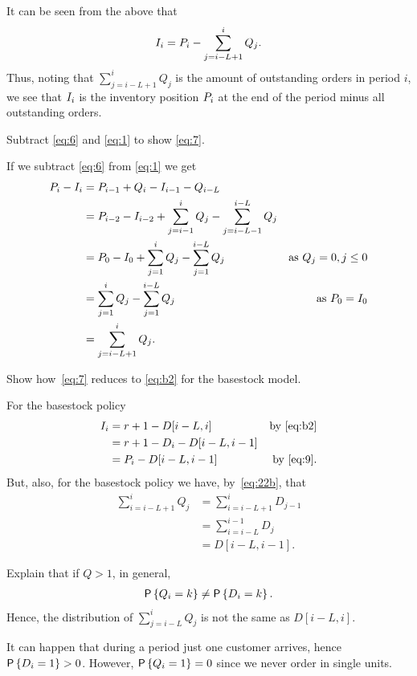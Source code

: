 It can be seen from the above that
  \begin{equation}\label{eq:7}
    I_i = P_i - \sum_{j=i-L+1}^i Q_j.
  \end{equation}
Thus, noting that $\sum_{j=i-L+1}^i Q_j$ is the amount of outstanding orders in period $i$, we see that $I_i$ is the inventory position $P_i$ at the end of the period minus all outstanding orders.

\begin{exercise}
  Subtract \eqref{eq:6} and \eqref{eq:1} to show \eqref{eq:7}.
\begin{solution}
  If we   subtract \eqref{eq:6} from \eqref{eq:1} we get 
  \begin{align*}
    P_i - I_i 
&= P_{i-1} + Q_{i} - I_{i-1} - Q_{i-L} \\
&= P_{i-2} - I_{i-2} + \sum_{j=i-1}^i Q_{j} - \sum_{j=i-L-1}^{i-L} Q_{j} \\
&= P_{0} - I_{0} + \sum_{j=1}^i Q_{j} - \sum_{j=1}^{i-L} Q_{j} &\text{as }Q_j=0, j\leq 0\\
&= \sum_{j=1}^i Q_{j} - \sum_{j=1}^{i-L} Q_{j} &\text{as }P_0 = I_0\\
&= \sum_{j=i-L+1}^i Q_{j}.
  \end{align*}
\end{solution}
\end{exercise}


\begin{exercise}
  Show how~\eqref{eq:7} reduces to \eqref{eq:b2} for the basestock model.
  \begin{solution}
For the basestock policy
    \begin{align*}
      I_i &= r+1 - D[i-L, i] & \text{by \eqref{eq:b2}} \\
&= r+1 -D_i - D[i-L, i-1] \\
&= P_i - D[i-L, i-1] & \text{ by \eqref{eq:9}}.
    \end{align*}
But, also,     for the basestock policy we have, by~\eqref{eq:22b}, that 
\begin{align*}
\sum_{i=i-L+1}^i Q_j 
&= \sum_{i=i-L+1}^i D_{j-1} \\ 
&= \sum_{i=i-L}^{i-1} D_{j} \\ 
&=D[i-L, i-1].
\end{align*}
  \end{solution}
\end{exercise}

\begin{exercise}
  Explain that if $Q>1$, in general,
  \begin{align*}
    \P{Q_i= k} \neq \P{D_i = k}.
  \end{align*}
Hence, the distribution of $\sum_{j=i-L}^i Q_j$ is not the same as $D[i-L, i]$. 
\begin{solution}
It can happen that during a period just one customer arrives, hence  $\P{D_i=1}>0$. However, $\P{Q_i=1}=0$ since we never order in single units. 
\end{solution}
\end{exercise}

